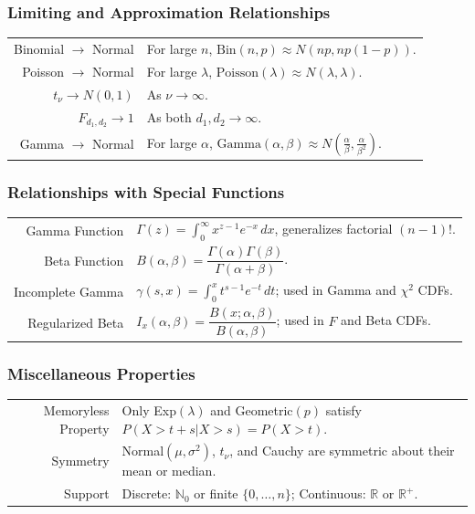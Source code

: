 \documentclass[11pt,a4paper]{article}
\theoremstyle{definition}
\begin{document}
\subsubsection*{Limiting and Approximation Relationships}
\begin{longtable}{r l}
Binomial $\to$ Normal & For large $n$, $\text{Bin}(n,p)\approx N(np, np(1-p))$.\\
Poisson $\to$ Normal & For large $\lambda$, $\text{Poisson}(\lambda)\approx N(\lambda,\lambda)$.\\
$t_\nu\to N(0,1)$ & As $\nu\to\infty$.\\
$F_{d_1,d_2}\to 1$ & As both $d_1,d_2\to\infty$.\\
Gamma $\to$ Normal & For large $\alpha$, $\text{Gamma}(\alpha,\beta)\approx N(\frac{\alpha}{\beta}, \frac{\alpha}{\beta^2})$.\\
\end{longtable}

\subsubsection*{Relationships with Special Functions}
\begin{longtable}{r l}
Gamma Function & $\Gamma(z)=\int_0^\infty x^{z-1}e^{-x}\,dx$, generalizes factorial $(n-1)!$.\\
Beta Function & $B(\alpha,\beta)=\dfrac{\Gamma(\alpha)\Gamma(\beta)}{\Gamma(\alpha+\beta)}$.\\
Incomplete Gamma & $\gamma(s,x)=\int_0^x t^{s-1}e^{-t}\,dt$; used in Gamma and $\chi^2$ CDFs.\\
Regularized Beta & $I_x(\alpha,\beta)=\dfrac{B(x;\alpha,\beta)}{B(\alpha,\beta)}$; used in $F$ and Beta CDFs.\\
\end{longtable}

\subsubsection*{Miscellaneous Properties}
\begin{longtable}{r l}
Memoryless Property & Only Exp$(\lambda)$ and Geometric$(p)$ satisfy $P(X>t+s|X>s)=P(X>t)$.\\
Symmetry & Normal$(\mu,\sigma^2)$, $t_\nu$, and Cauchy are symmetric about their mean or median.\\
Support & Discrete: $\mathbb{N}_0$ or finite $\{0,\dots,n\}$; Continuous: $\mathbb{R}$ or $\mathbb{R}^+$.\\
\end{longtable}
\end{document}
